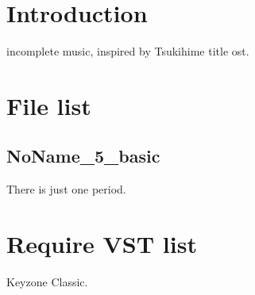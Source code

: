 \documentclass{article}
\author{Seycho Han}
\begin{document}
\begin{CJK}{UTF8}{ipxm}

\section{Introduction}
incomplete music, inspired by Tsukihime title ost\cite{tsukihime}.
\\
\section{File list}
\subsection{NoName\_5\_basic}
There is just one period.
\\

\section{Require VST list}
Keyzone Classic\cite{keyzone}.
\\




\end{CJK}
\end{document}
